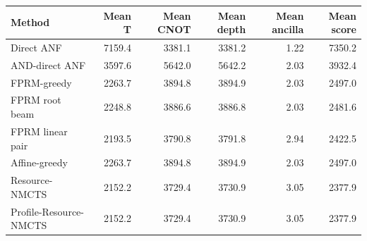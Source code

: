 \begin{tabular}{lrrrrr}
\toprule
Method & Mean T & Mean CNOT & Mean depth & Mean ancilla & Mean score \\
\midrule
Direct ANF & 7159.4 & 3381.1 & 3381.2 & 1.22 & 7350.2 \\
AND-direct ANF & 3597.6 & 5642.0 & 5642.2 & 2.03 & 3932.4 \\
FPRM-greedy & 2263.7 & 3894.8 & 3894.9 & 2.03 & 2497.0 \\
FPRM root beam & 2248.8 & 3886.6 & 3886.8 & 2.03 & 2481.6 \\
FPRM linear pair & 2193.5 & 3790.8 & 3791.8 & 2.94 & 2422.5 \\
Affine-greedy & 2263.7 & 3894.8 & 3894.9 & 2.03 & 2497.0 \\
Resource-NMCTS & 2152.2 & 3729.4 & 3730.9 & 3.05 & 2377.9 \\
Profile-Resource-NMCTS & 2152.2 & 3729.4 & 3730.9 & 3.05 & 2377.9 \\
\bottomrule
\end{tabular}
